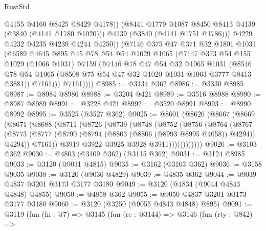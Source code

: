 \begin{lexlean}{RustStd}
\begin{coremodule}
                    @4155
                    @4160
                    @8425
                    @8429
                    @4178))
                (@8441 @1779 @1087 @8450 @8413 @4139 (@3840 (@4141 @1780 @1020)))
                @4139
                (@3840 (@4141 @1751 @1786)))
              @4229
              @4232
              @4235
              @4239
              @4244
              @4250))
          (@7146
            @375
            @47
            @371
            @32
            @1801
            @1031
            (@6589
              @4645
              @895
              @45
              @78
              @54
              @54
              @1029
              @1065
              (@7147
                @373
                @54
                @155
                @1029
                (@1066 @1031)
                @7159
                (@7146
                  @78
                  @47
                  @54
                  @32
                  @1065
                  @1031
                  (@8546 @78 @54 @1065 (@8508 @75 @54 @47 @32 @1020 @1031 @1063 @3777 @8413 @3881))
                  @7161)))
            @7161))))
@8985 := @3134 @362
@8986 := @3330 @8985
@8987 := @8984 @8986
@8988 := @3204 @421
@8989 := @3516 @8988
@8990 := @8987 @8989
@8991 := @3228 @421
@8992 := @3520 @8991
@8993 := @8990 @8992
@8995 := @3525 (@3527 @362)
@9025 := @8601
    (@8626
      (@8667
        (@8669
          (@8671
            (@8688
              (@8711
                (@8726
                  (@8739
                    (@8748
                      (@8752
                        (@8756
                          (@8764
                            (@8767
                              (@8773
                                (@8777
                                  (@8790 (@8794 (@8803 (@8806 (@8993 @8995 @4058)) @4294)) @4294))
                                @7161))
                            @3919
                            @3922
                            @3925
                            @3928
                            @3911))))))))))))
@9026 := @3103 @362
@9030 := @4803 (@3109 @362) (@3115 @362)
@9031 := @3124 @8985
@9033 := @3120 (@9031 @4815)
@9035 := @3162 (@3163 @362)
@9036 := @3158 @9035
@9038 := @3120 (@9036 @4829)
@9039 := @4835 @362
@9044 := @9039 @4837 @3201 @3173 @3177 @3180
@9049 := @3120 (@4834 (@9044 @4843 @4848) @4855)
@9050 := @4858 @362
@9055 := @9050 @4837 @3201 @3173 @3177 @3180
@9060 := @3120 (@3250 (@9055 @4843 @4848) @895)
@9091 := @3119
    (fun (fn : @7) =>
    @3145
      (fun (rc : @3144) =>
      @3146
        (fun (rty : @842) =>

\end{coremodule}
\end{lexlean}

